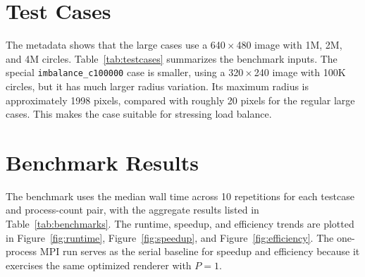 \documentclass{article}
\begin{document}
\section{Test Cases}
The metadata shows that the large cases use a 640\,$\times$\,480 image with 1M, 2M, and 4M circles. Table~\ref{tab:testcases} summarizes the benchmark inputs. The special \texttt{imbalance\_c100000} case is smaller, using a 320\,$\times$\,240 image with 100K circles, but it has much larger radius variation. Its maximum radius is approximately 1998 pixels, compared with roughly 20 pixels for the regular large cases. This makes the case suitable for stressing load balance.

\begin{table}[htbp]
\centering
{}
\caption{Summary of benchmark test cases.}
\label{tab:testcases}
\end{table}

\section{Benchmark Results}
The benchmark uses the median wall time across 10 repetitions for each testcase and process-count pair, with the aggregate results listed in Table~\ref{tab:benchmarks}. The runtime, speedup, and efficiency trends are plotted in Figure~\ref{fig:runtime}, Figure~\ref{fig:speedup}, and Figure~\ref{fig:efficiency}. The one-process MPI run serves as the serial baseline for speedup and efficiency because it exercises the same optimized renderer with \(P=1\).
\end{document}
